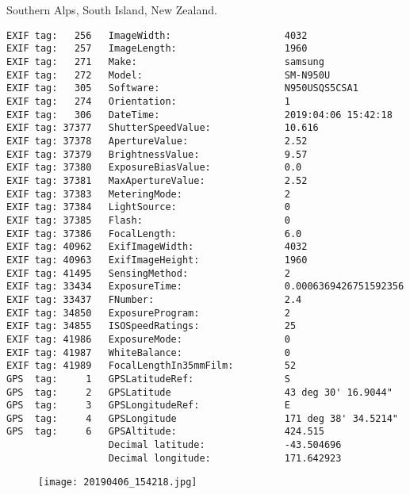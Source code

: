 \section{\protect{}}
\noindent Southern Alps, South Island, New Zealand.
\noindent
\begin{lstlisting}
EXIF tag:   256   ImageWidth:                    4032
EXIF tag:   257   ImageLength:                   1960
EXIF tag:   271   Make:                          samsung
EXIF tag:   272   Model:                         SM-N950U
EXIF tag:   305   Software:                      N950USQS5CSA1
EXIF tag:   274   Orientation:                   1
EXIF tag:   306   DateTime:                      2019:04:06 15:42:18
EXIF tag: 37377   ShutterSpeedValue:             10.616
EXIF tag: 37378   ApertureValue:                 2.52
EXIF tag: 37379   BrightnessValue:               9.57
EXIF tag: 37380   ExposureBiasValue:             0.0
EXIF tag: 37381   MaxApertureValue:              2.52
EXIF tag: 37383   MeteringMode:                  2
EXIF tag: 37384   LightSource:                   0
EXIF tag: 37385   Flash:                         0
EXIF tag: 37386   FocalLength:                   6.0
EXIF tag: 40962   ExifImageWidth:                4032
EXIF tag: 40963   ExifImageHeight:               1960
EXIF tag: 41495   SensingMethod:                 2
EXIF tag: 33434   ExposureTime:                  0.0006369426751592356
EXIF tag: 33437   FNumber:                       2.4
EXIF tag: 34850   ExposureProgram:               2
EXIF tag: 34855   ISOSpeedRatings:               25
EXIF tag: 41986   ExposureMode:                  0
EXIF tag: 41987   WhiteBalance:                  0
EXIF tag: 41989   FocalLengthIn35mmFilm:         52
GPS  tag:     1   GPSLatitudeRef:                S
GPS  tag:     2   GPSLatitude                    43 deg 30' 16.9044"
GPS  tag:     3   GPSLongitudeRef:               E
GPS  tag:     4   GPSLongitude                   171 deg 38' 34.5214"
GPS  tag:     6   GPSAltitude:                   424.515
                  Decimal latitude:              -43.504696
                  Decimal longitude:             171.642923

\end{lstlisting}
\clearpage
\begin{figure}
\raggedleft
\texttt{[image: 20190406\_154218.jpg]}
\end{figure}


\clearpage
